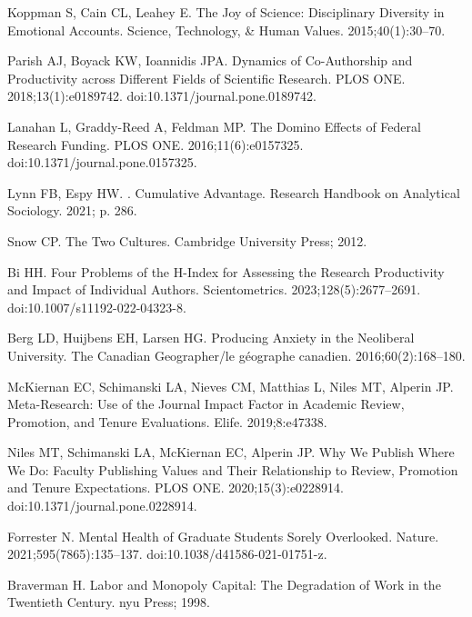 \documentclass[
  10pt,
  letterpaper,
]{article}
\begin{document}
\begin{thebibliography}{10}
Koppman S, Cain CL, Leahey E.
\newblock The Joy of Science: {{Disciplinary}} Diversity in Emotional Accounts.
\newblock Science, Technology, \& Human Values. 2015;40(1):30--70.

Parish AJ, Boyack KW, Ioannidis JPA.
\newblock Dynamics of Co-Authorship and Productivity across Different Fields of Scientific Research.
\newblock PLOS ONE. 2018;13(1):e0189742.
\newblock doi:{10.1371/journal.pone.0189742}.

Lanahan L, {Graddy-Reed} A, Feldman MP.
\newblock The {{Domino Effects}} of {{Federal Research Funding}}.
\newblock PLOS ONE. 2016;11(6):e0157325.
\newblock doi:{10.1371/journal.pone.0157325}.

Lynn FB, Espy HW.
. {{Cumulative}} Advantage.
\newblock Research Handbook on Analytical Sociology. 2021; p. 286.

Snow CP.
\newblock The Two Cultures.
\newblock Cambridge University Press; 2012.

Bi HH.
\newblock Four Problems of the H-Index for Assessing the Research Productivity and Impact of Individual Authors.
\newblock Scientometrics. 2023;128(5):2677--2691.
\newblock doi:{10.1007/s11192-022-04323-8}.

Berg LD, Huijbens EH, Larsen HG.
\newblock Producing Anxiety in the Neoliberal University.
\newblock The Canadian Geographer/le g{\'e}ographe canadien. 2016;60(2):168--180.

McKiernan EC, Schimanski LA, Nieves CM, Matthias L, Niles MT, Alperin JP.
\newblock Meta-Research: {{Use}} of the Journal Impact Factor in Academic Review, Promotion, and Tenure Evaluations.
\newblock Elife. 2019;8:e47338.

Niles MT, Schimanski LA, McKiernan EC, Alperin JP.
\newblock Why We Publish Where We Do: {{Faculty}} Publishing Values and Their Relationship to Review, Promotion and Tenure Expectations.
\newblock PLOS ONE. 2020;15(3):e0228914.
\newblock doi:{10.1371/journal.pone.0228914}.

Forrester N.
\newblock Mental Health of Graduate Students Sorely Overlooked.
\newblock Nature. 2021;595(7865):135--137.
\newblock doi:{10.1038/d41586-021-01751-z}.

Braverman H.
\newblock Labor and Monopoly Capital: {{The}} Degradation of Work in the Twentieth Century.
\newblock nyu Press; 1998.


\end{thebibliography}
\end{document}
